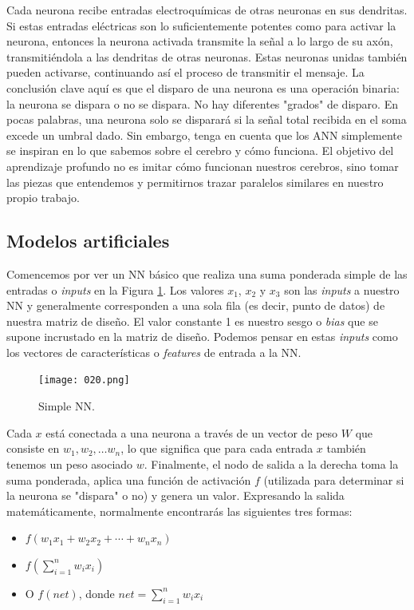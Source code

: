 \documentclass[14.5pt,a4paper]{article}
\begin{document}
Cada neurona recibe entradas electroquímicas de otras neuronas en sus dendritas. Si estas entradas eléctricas son lo suficientemente potentes como para activar la neurona, entonces la neurona activada transmite la señal a lo largo de su axón, transmitiéndola a las dendritas de otras neuronas. Estas neuronas unidas también pueden activarse, continuando así el proceso de transmitir el mensaje.
La conclusión clave aquí es que el disparo de una neurona es una operación binaria: la neurona se dispara o no se dispara. No hay diferentes "grados" de disparo. En pocas palabras, una neurona solo se disparará si la señal total recibida en el soma excede un umbral dado.
Sin embargo, tenga en cuenta que los ANN simplemente se inspiran en lo que sabemos sobre el cerebro y cómo funciona. El objetivo del aprendizaje profundo no es imitar cómo funcionan nuestros cerebros, sino tomar las piezas que entendemos y permitirnos trazar paralelos similares en nuestro propio trabajo.

\subsection{Modelos artificiales}
Comencemos por ver un NN básico que realiza una suma ponderada simple de las entradas o \textit{inputs} en la Figura \ref{fig:simplenn}. Los valores $x_1$, $x_2$ y $x_3$ son las \textit{inputs} a nuestro NN y generalmente corresponden a una sola fila (es decir, punto de datos) de nuestra matriz de diseño. El valor constante 1 es nuestro sesgo o \textit{bias} que se supone incrustado en la matriz de diseño. Podemos pensar en estas \textit{inputs} como los vectores de características o \textit{features} de entrada a la NN.

\begin{figure}[H]
	\begin{center}				
	\texttt{[image: 020.png]}
  	\caption{Simple NN.}
  	\label{fig:simplenn}
  	\end{center}
\end{figure}

Cada $x$ está conectada a una neurona a través de un vector de peso $W$ que consiste en $w_1, w_2, \ldots w_n$, lo que significa que para cada entrada $x$ también tenemos un peso asociado $w$.
Finalmente, el nodo de salida a la derecha toma la suma ponderada, aplica una función de activación $f$ (utilizada para determinar si la neurona se "dispara" o no) y genera un valor. Expresando la salida matemáticamente, normalmente encontrarás las siguientes tres formas:
\begin{itemize}
\item $f(w_1x_1 + w_2x_2 + \cdots + w_nx_n)$
\item $f(\sum_{i=1}^{n} w_ix_i)$	
\item O $f(net)$, donde $net = \sum_{i=1}^{n} w_ix_i$
\end{itemize}
\end{document}
